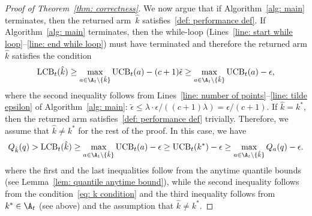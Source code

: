 \begin{proof}[Proof of Theorem~\ref{thm: correctness}]
    We now argue that if Algorithm~\ref{alg: main} terminates, then the returned arm~$\hat{k}$ satisfies~\eqref{def: performance def}. 
    If Algorithm~\ref{alg: main} terminates,
    then the while-loop (Lines~\ref{line: start while loop}--\ref{line: end while loop}) must have terminated and therefore the returned arm $\hat{k}$
    satisfies the condition
    \begin{equation}
    \label{eq: k condition}
    \mathrm{LCB}_t(\hat{k})  \ge
                \max\limits_{a \in \A_t \setminus \{ \hat{k} \} }  
                \mathrm{UCB}_t(a) -  (c+1)\tilde{\epsilon}
                 \ge
          \max\limits_{a \in \A_t \setminus \{ \hat{k} \} }  
                \mathrm{UCB}_t(a)  - \epsilon,
    \end{equation}
    where the second inequality follows from Lines~\ref{line: number of points}--\ref{line: tilde epsilon} of Algorithm~\ref{alg: main}: $\tilde{\epsilon} \le \lambda \cdot \epsilon/((c+1) \lambda) = \epsilon/(c+1)$.
    If $\hat{k} = k^*$, then the returned arm satisfies~\eqref{def: performance def} trivially. Therefore, we assume that $\hat{k} \ne k^*$ for the rest of the proof. In this case, we have
    \begin{equation}
        Q_{\hat{k}}(q) >
        \mathrm{LCB}_t(\hat{k})  \ge
        \max\limits_{a \in \A_t \setminus \{ \hat{k} \} } 
        \mathrm{UCB}_t(a) -  
        \epsilon
        \ge 
        \mathrm{UCB}_t(k^*) -  \epsilon
        \ge
        \max\limits_{a \in \A_t \setminus \{ \hat{k} \} }
        Q_a(q) -  \epsilon.
    \end{equation}
    where the first and the last inequalities follow from the anytime quantile bounds (see Lemma~\ref{lem: quantile anytime bound}), while the second inequality follows from the condition~\eqref{eq: k condition} and the third inequality follows from $k^* \in \A_t$ (see above) and the assumption that $\hat{k} \ne k^*$.
\end{proof}